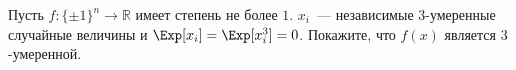 Пусть $f\colon \{\pm 1\}^n \to \mathbb{R}$ имеет степень не более $1$. $x_i$~--- независимые
$3$-умеренные случайные величины и $\Exp[x_i] = \Exp[x_i^3] = 0$. Покажите, что $f(x)$ является
$3$-умеренной.
